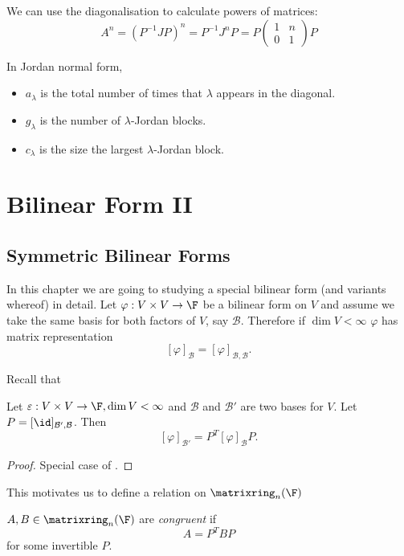 \documentclass[a4paper]{article}
\newcommand*{\M}{\matrixring}
\newcommand*{\basis}{\mathcal}
\theoremstyle{definition}
\begin{document}
We can use the diagonalisation to calculate powers of matrices:
\[
  A^n = (P^{-1}JP)^n = P^{-1}J^nP = P
  \begin{pmatrix}
    1 & n \\
    0 & 1
  \end{pmatrix}
  P
\]

\begin{remark}
  In Jordan normal form,
  \begin{itemize}
  \item \(a_\lambda\) is the total number of times that \(\lambda\) appears in the diagonal.
  \item \(g_\lambda\) is the number of \(\lambda\)-Jordan blocks.
  \item \(c_\lambda\) is the size the largest \(\lambda\)-Jordan block.
  \end{itemize}
\end{remark}

\section{Bilinear Form II}

\subsection{Symmetric Bilinear Forms}

In this chapter we are going to studying a special bilinear form (and variants whereof) in detail. Let \(\varphi: V \times V \to \F\) be a bilinear form on \(V\) and assume we take the same basis for both factors of \(V\), say \(\basis B\). Therefore if \(\dim V < \infty\) \(\varphi\) has matrix representation
\[
  [\varphi]_{\basis B} = [\varphi]_{\basis B, \basis B}.
\]

Recall that
\begin{lemma}
  Let \(\varepsilon: V \times V \to \F, \dim V < \infty\) and \(\basis B\) and \(\basis B'\) are two bases for \(V\). Let \(P = [\id]_{\basis B', \basis B}\). Then
  \[
    [\varphi]_{\basis B'} = P^T[\varphi]_{\basis B}P.
  \]
\end{lemma}

\begin{proof}
  Special case of .
\end{proof}

This motivates us to define a relation on \(\M_n(\F)\)

\begin{definition}[Congruent]
  \(A, B \in \M_n(\F)\) are \emph{congruent} if
  \[
    A = P^TBP
  \]
  for some invertible \(P\).
\end{definition}
\end{document}
